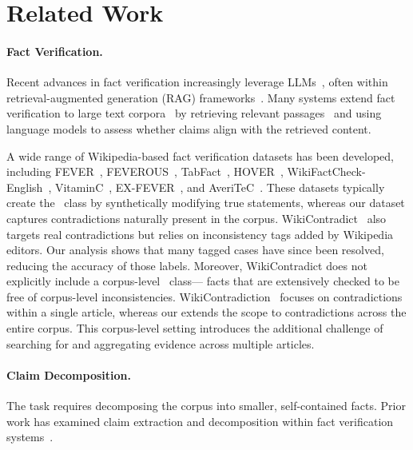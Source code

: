 \section{Related Work}
\label{sec:related_work}

\paragraph{Fact Verification.}
Recent advances in fact verification increasingly leverage LLMs~\citep{luu2024zefav, jayaweera-etal-2024-amrex}, often within retrieval-augmented generation (RAG) frameworks~\citep{malviya2024evidence, rothermel-etal-2024-infact, chern2023factool, xie2024improvingmodelfactualityfinegrained}. Many systems extend fact verification to large text corpora~\citep{schuster-etal-2022-stretching} by retrieving relevant passages~\citep{khattab2020colbertefficienteffectivepassage} and using language models to assess whether claims align with the retrieved content.

A wide range of Wikipedia-based fact verification datasets has been developed, including FEVER~\citep{thorne-etal-2018-fact}, FEVEROUS~\citep{feverous}, TabFact~\citep{chen2020tabfactlargescaledatasettablebased}, HOVER~\citep{jiang-etal-2020-hover}, WikiFactCheck-English~\citep{sathe-etal-2020-automated}, VitaminC~\citep{schuster-etal-2021-get}, EX-FEVER~\citep{ma-etal-2024-ex}, and AveriTeC~\citep{schlichtkrull-etal-2024-automated}. These datasets typically create the ~class by synthetically modifying true statements, whereas our dataset captures contradictions naturally present in the corpus. WikiContradict~\citep{hou2024wikicontradict} also targets real contradictions but relies on inconsistency tags added by Wikipedia editors. Our analysis shows that many tagged cases have since been resolved, reducing the accuracy of those labels. Moreover, WikiContradict does not explicitly include a corpus-level \supports~class--- facts that are extensively checked to be free of corpus-level inconsistencies. WikiContradiction~\cite{hsu2021wikicontradiction} focuses on contradictions within a single article, whereas our \dataset extends the scope to contradictions across the entire corpus. This corpus-level setting introduces the additional challenge of searching for and aggregating evidence across multiple articles.

\paragraph{Claim Decomposition.}
The \task task requires decomposing the corpus into smaller, self-contained facts. Prior work has examined claim extraction and decomposition within fact verification systems~\citep{hu2024decompositiondilemmasdoesclaim, wührl2024selfadaptiveparaphrasingpreferencelearning, min2023factscore, song2024veriscore, cattan2024localizingfactualinconsistenciesattributable, gunjal-durrett-2024-molecular, pham-etal-2025-verify}.




